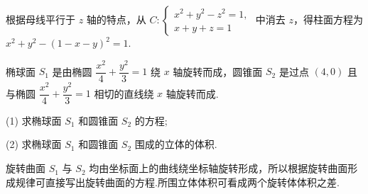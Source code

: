 \begin{solution}
    根据母线平行于 $z$ 轴的特点，从 $C: \begin{cases} x^2+y^2-z^2=1, \\ x+y+z=1 \end{cases}$ 中消去 $z$，得柱面方程为 $x^2+y^2-(1-x-y)^2=1$.
\end{solution}
\begin{problem}
    椭球面 $S_1$ 是由椭圆 $\dfrac{x^2}{4}+\dfrac{y^2}{3}=1$ 绕 $x$ 轴旋转而成，圆锥面 $S_2$ 是过点 $(4,0)$ 且与椭圆 $\dfrac{x^2}{4}+\dfrac{y^2}{3}=1$ 相切的直线绕 $x$ 轴旋转而成.

(1) 求椭球面 $S_1$ 和圆锥面 $S_2$ 的方程;

(2) 求椭球面 $S_1$ 和圆锥面 $S_2$ 围成的立体的体积.

\end{problem}
\begin{note}
    旋转曲面 $S_1$ 与 $S_2$ 均由坐标面上的曲线绕坐标轴旋转形成，所以根据旋转曲面形成规律可直接写出旋转曲面的方程.所围立体体积可看成两个旋转体体积之差.
\end{note}

